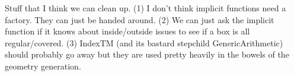 Stuff that I think we can clean up.
(1) I don't think implicit functions need a factory.  They can just be
handed around.
(2) We can just ask the implicit function if it knows about
inside/outside issues to see if a box is all regular/covered.
(3) IndexTM (and its bastard stepchild GenericArithmetic) should
probably go away but they are used pretty heavily in the bowels of the
geometry generation.
